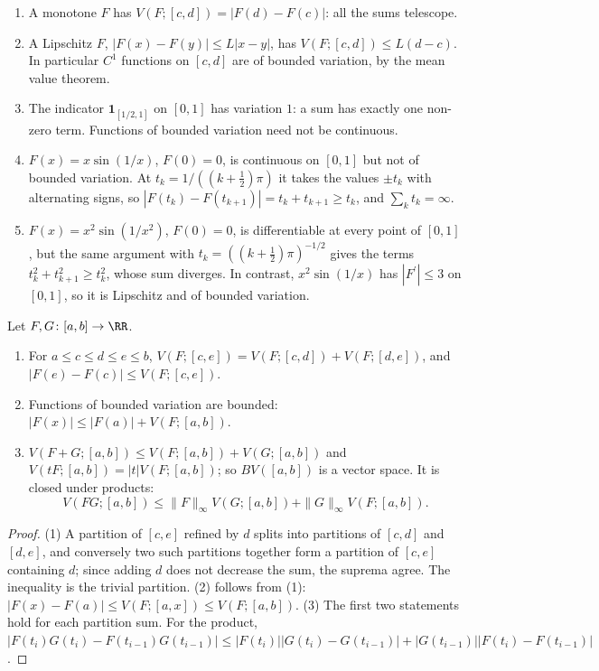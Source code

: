 \begin{example}\label{lebesgue-differentiation:example-bounded-variation}
\begin{enumerate}
\item A monotone $F$ has $V(F; [c, d]) = |F(d) - F(c)|$: all the sums telescope.
\item A Lipschitz $F$, $|F(x) - F(y)| \leq L|x - y|$, has $V(F; [c, d]) \leq L(d - c)$. In particular $C^1$ functions on $[c, d]$ are of bounded variation, by the mean value theorem.
\item The indicator $\mathbf{1}_{[1/2, 1]}$ on $[0, 1]$ has variation $1$: a sum has exactly one non-zero term. Functions of bounded variation need not be continuous.
\item $F(x) = x\sin(1/x)$, $F(0) = 0$, is continuous on $[0, 1]$ but not of bounded variation. At $t_k = 1/((k + \frac12)\pi)$ it takes the values $\pm t_k$ with alternating signs, so
$|F(t_k) - F(t_{k+1})| = t_k + t_{k+1} \geq t_k$, and $\sum_k t_k = \infty$.
\item $F(x) = x^2\sin(1/x^2)$, $F(0) = 0$, is differentiable at every point of $[0, 1]$, but the same argument with $t_k = ((k + \frac12)\pi)^{-1/2}$ gives the terms $t_k^2 + t_{k+1}^2 \geq t_k^2$,
whose sum diverges. In contrast, $x^2\sin(1/x)$ has $|F^{\prime}| \leq 3$ on $[0, 1]$, so it is Lipschitz and of bounded variation.
\end{enumerate}
\end{example}

\begin{proposition}\label{lebesgue-differentiation:proposition-variation}
Let $F, G \colon [a, b] \to \RR$.
\begin{enumerate}
\item For $a \leq c \leq d \leq e \leq b$, $V(F; [c, e]) = V(F; [c, d]) + V(F; [d, e])$, and $|F(e) - F(c)| \leq V(F; [c, e])$.
\item Functions of bounded variation are bounded: $|F(x)| \leq |F(a)| + V(F; [a, b])$.
\item $V(F + G; [a, b]) \leq V(F; [a, b]) + V(G; [a, b])$ and $V(tF; [a, b]) = |t|V(F; [a, b])$; so $BV([a, b])$ is a vector space. It is closed under
products:
\[
V(FG; [a, b]) \leq \|F\|_\infty V(G; [a, b]) + \|G\|_\infty V(F; [a, b]).
\]
\end{enumerate}
\end{proposition}

\begin{proof}
(1) A partition of $[c, e]$ refined by $d$ splits into partitions of $[c, d]$ and $[d, e]$, and conversely two such partitions together form a partition of $[c, e]$ containing $d$; since adding $d$ does not
decrease the sum, the suprema agree. The inequality is the trivial partition. (2) follows from (1): $|F(x) - F(a)| \leq V(F; [a, x]) \leq V(F; [a, b])$. (3) The first two statements hold for each partition sum.
For the product, $|F(t_i)G(t_i) - F(t_{i-1})G(t_{i-1})| \leq |F(t_i)||G(t_i) - G(t_{i-1})| + |G(t_{i-1})||F(t_i) - F(t_{i-1})|$.
\end{proof}

